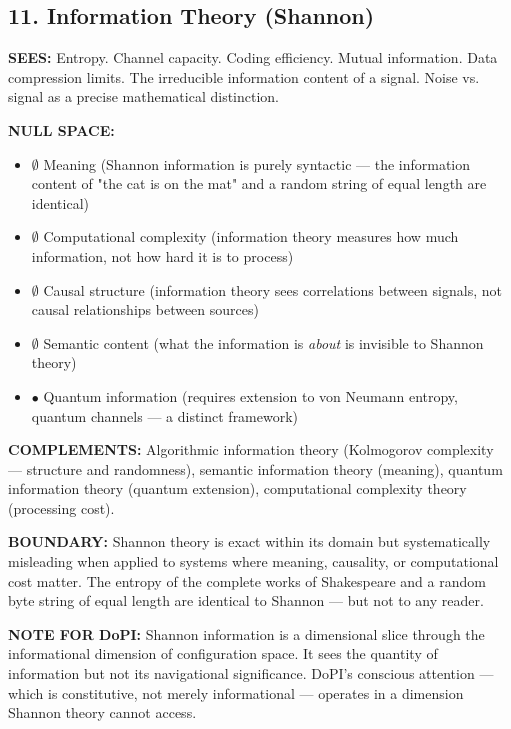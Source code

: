 \bigskip\noindent\makebox[\textwidth]{\color{rulegray}\rule{5cm}{0.3pt}}\bigskip


\subsection*{11. Information Theory (Shannon)}


\textbf{SEES:} Entropy. Channel capacity. Coding efficiency. Mutual information. Data compression limits. The irreducible information content of a signal. Noise vs. signal as a precise mathematical distinction.


\textbf{NULL SPACE:}

\begin{itemize}[nosep,leftmargin=*]
  \item $\emptyset$ Meaning (Shannon information is purely syntactic — the information content of "the cat is on the mat" and a random string of equal length are identical)
  \item $\emptyset$ Computational complexity (information theory measures how much information, not how hard it is to process)
  \item $\emptyset$ Causal structure (information theory sees correlations between signals, not causal relationships between sources)
  \item $\emptyset$ Semantic content (what the information is \textit{about} is invisible to Shannon theory)
  \item $\bullet$ Quantum information (requires extension to von Neumann entropy, quantum channels — a distinct framework)
\end{itemize}


\textbf{COMPLEMENTS:} Algorithmic information theory (Kolmogorov complexity — structure and randomness), semantic information theory (meaning), quantum information theory (quantum extension), computational complexity theory (processing cost).


\textbf{BOUNDARY:} Shannon theory is exact within its domain but systematically misleading when applied to systems where meaning, causality, or computational cost matter. The entropy of the complete works of Shakespeare and a random byte string of equal length are identical to Shannon — but not to any reader.


\textbf{NOTE FOR DoPI:} Shannon information is a dimensional slice through the informational dimension of configuration space. It sees the quantity of information but not its navigational significance. DoPI's conscious attention — which is constitutive, not merely informational — operates in a dimension Shannon theory cannot access.


